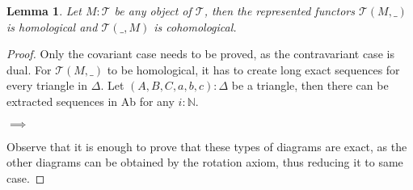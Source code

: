 \documentclass[11pt]{article}
\newtheorem{lemma}[theorem]{Lemma}
\theoremstyle{definition}
\theoremstyle{remark}
\begin{document}
            \begin{lemma}
                Let $M:\mathcal{T}$ be any object of $\mathcal{T}$, then the represented functors $\mathcal{T}(M,\_)$ is homological and $\mathcal{T}(\_,M)$ is cohomological.
            \end{lemma}

            \begin{proof}
                Only the covariant case needs to be proved, as the contravariant case is dual. For $\mathcal{T}(M,\_)$ to be homological, it has to create long exact sequences for every triangle in $\Delta$. Let $(A,B,C,a,b,c):\Delta$ be a triangle, then there can be extracted sequences in Ab for any $i:\mathbb{N}$.

                \begin{center}
                     $\implies$
                \end{center}
                Observe that it is enough to prove that these types of diagrams are exact, as the other diagrams can be obtained by the rotation axiom, thus reducing it to same case. 
                

\end{proof}
\end{document}
